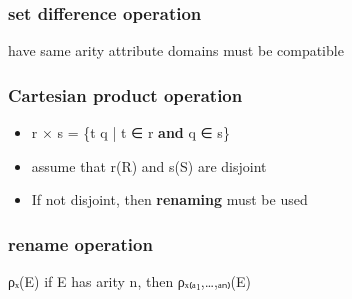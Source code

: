 \documentclass[11pt]{article}
\begin{document}
\subsubsection{set difference operation}
\label{sec-4-1-4}
have same arity
attribute domains must be compatible
\subsubsection{Cartesian product operation}
\label{sec-4-1-5}
\begin{itemize}
\item r × s = \{t q | t ∈ r \textbf{and} q ∈ s\}
\item assume that r(R) and s(S) are disjoint
\item If not disjoint, then \textbf{renaming} must be used
\end{itemize}
\subsubsection{rename operation}
\label{sec-4-1-6}
ρₓ(E)
if E has arity n, then
ρₓ₍ₐ₁,\ldots{},ₐₙ₎(E)
\end{document}
